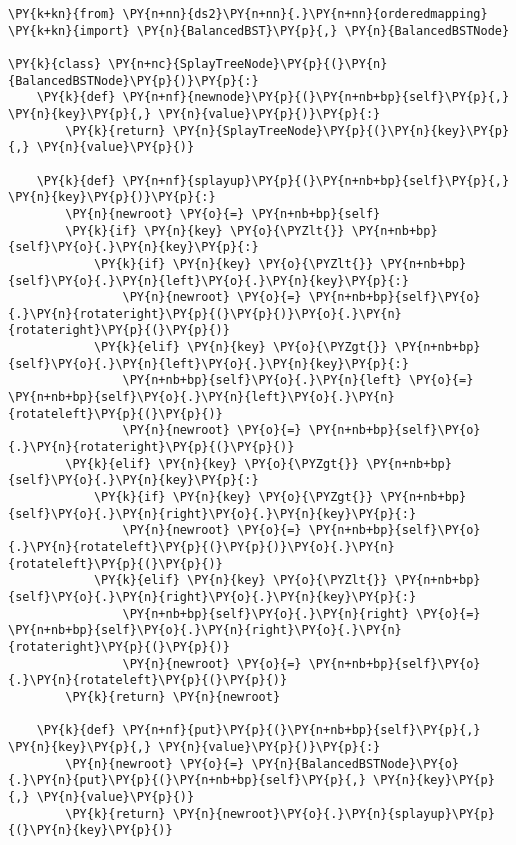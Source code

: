 \begin{Verbatim}[commandchars=\\\{\}]
\PY{k+kn}{from} \PY{n+nn}{ds2}\PY{n+nn}{.}\PY{n+nn}{orderedmapping} \PY{k+kn}{import} \PY{n}{BalancedBST}\PY{p}{,} \PY{n}{BalancedBSTNode}

\PY{k}{class} \PY{n+nc}{SplayTreeNode}\PY{p}{(}\PY{n}{BalancedBSTNode}\PY{p}{)}\PY{p}{:}
    \PY{k}{def} \PY{n+nf}{newnode}\PY{p}{(}\PY{n+nb+bp}{self}\PY{p}{,} \PY{n}{key}\PY{p}{,} \PY{n}{value}\PY{p}{)}\PY{p}{:}
        \PY{k}{return} \PY{n}{SplayTreeNode}\PY{p}{(}\PY{n}{key}\PY{p}{,} \PY{n}{value}\PY{p}{)}

    \PY{k}{def} \PY{n+nf}{splayup}\PY{p}{(}\PY{n+nb+bp}{self}\PY{p}{,} \PY{n}{key}\PY{p}{)}\PY{p}{:}
        \PY{n}{newroot} \PY{o}{=} \PY{n+nb+bp}{self}
        \PY{k}{if} \PY{n}{key} \PY{o}{\PYZlt{}} \PY{n+nb+bp}{self}\PY{o}{.}\PY{n}{key}\PY{p}{:}
            \PY{k}{if} \PY{n}{key} \PY{o}{\PYZlt{}} \PY{n+nb+bp}{self}\PY{o}{.}\PY{n}{left}\PY{o}{.}\PY{n}{key}\PY{p}{:}
                \PY{n}{newroot} \PY{o}{=} \PY{n+nb+bp}{self}\PY{o}{.}\PY{n}{rotateright}\PY{p}{(}\PY{p}{)}\PY{o}{.}\PY{n}{rotateright}\PY{p}{(}\PY{p}{)}
            \PY{k}{elif} \PY{n}{key} \PY{o}{\PYZgt{}} \PY{n+nb+bp}{self}\PY{o}{.}\PY{n}{left}\PY{o}{.}\PY{n}{key}\PY{p}{:}
                \PY{n+nb+bp}{self}\PY{o}{.}\PY{n}{left} \PY{o}{=} \PY{n+nb+bp}{self}\PY{o}{.}\PY{n}{left}\PY{o}{.}\PY{n}{rotateleft}\PY{p}{(}\PY{p}{)}
                \PY{n}{newroot} \PY{o}{=} \PY{n+nb+bp}{self}\PY{o}{.}\PY{n}{rotateright}\PY{p}{(}\PY{p}{)}
        \PY{k}{elif} \PY{n}{key} \PY{o}{\PYZgt{}} \PY{n+nb+bp}{self}\PY{o}{.}\PY{n}{key}\PY{p}{:}
            \PY{k}{if} \PY{n}{key} \PY{o}{\PYZgt{}} \PY{n+nb+bp}{self}\PY{o}{.}\PY{n}{right}\PY{o}{.}\PY{n}{key}\PY{p}{:}
                \PY{n}{newroot} \PY{o}{=} \PY{n+nb+bp}{self}\PY{o}{.}\PY{n}{rotateleft}\PY{p}{(}\PY{p}{)}\PY{o}{.}\PY{n}{rotateleft}\PY{p}{(}\PY{p}{)}
            \PY{k}{elif} \PY{n}{key} \PY{o}{\PYZlt{}} \PY{n+nb+bp}{self}\PY{o}{.}\PY{n}{right}\PY{o}{.}\PY{n}{key}\PY{p}{:}
                \PY{n+nb+bp}{self}\PY{o}{.}\PY{n}{right} \PY{o}{=} \PY{n+nb+bp}{self}\PY{o}{.}\PY{n}{right}\PY{o}{.}\PY{n}{rotateright}\PY{p}{(}\PY{p}{)}
                \PY{n}{newroot} \PY{o}{=} \PY{n+nb+bp}{self}\PY{o}{.}\PY{n}{rotateleft}\PY{p}{(}\PY{p}{)}
        \PY{k}{return} \PY{n}{newroot}

    \PY{k}{def} \PY{n+nf}{put}\PY{p}{(}\PY{n+nb+bp}{self}\PY{p}{,} \PY{n}{key}\PY{p}{,} \PY{n}{value}\PY{p}{)}\PY{p}{:}
        \PY{n}{newroot} \PY{o}{=} \PY{n}{BalancedBSTNode}\PY{o}{.}\PY{n}{put}\PY{p}{(}\PY{n+nb+bp}{self}\PY{p}{,} \PY{n}{key}\PY{p}{,} \PY{n}{value}\PY{p}{)}
        \PY{k}{return} \PY{n}{newroot}\PY{o}{.}\PY{n}{splayup}\PY{p}{(}\PY{n}{key}\PY{p}{)}


\end{Verbatim}
